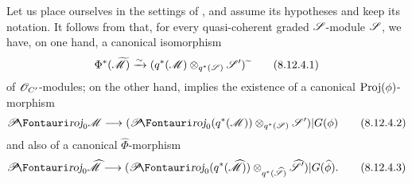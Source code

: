\begin{env}[8.12.4]
\label{II.8.12.4}
Let us place ourselves in the settings of , and assume its hypotheses and keep its notation.
It follows from  that, for every quasi-coherent graded $\mathscr{S}$-module $\mathscr{S}$, we have, on one hand, a canonical isomorphism
\[
\label{II.8.12.4.1}
    \Phi^*(\widetilde{\mathscr{M}}) \xrightarrow{\sim} (q^*(\mathscr{M})\otimes_{q^*(\mathscr{S})}\mathscr{S}'){\,\widetilde{\,}\,}
\tag{8.12.4.1}
\]
of $\mathscr{O}_{C'}$-modules;
on the other hand,  implies the existence of a canonical $\operatorname{Proj}(\phi)$-morphism
\[
\label{II.8.12.4.2}
    \shProj_0\sh{M} \to (\shProj_0(q^*(\sh{M}))\otimes_{q^*(\sh{S})}\sh{S}')|G(\vphi)
\tag{8.12.4.2}
\]
and also of a canonical $\widehat{\Phi}$-morphism
\[
\label{II.8.12.4.3}
    \shProj_0\widehat{\sh{M}} \to (\shProj_0(q^*(\widehat{\sh{M}}))\otimes_{q^*(\widehat{\sh{S}})}\widehat{\sh{S}}')|G(\widehat{\vphi}).
\tag{8.12.4.3}
\]
\end{env}

